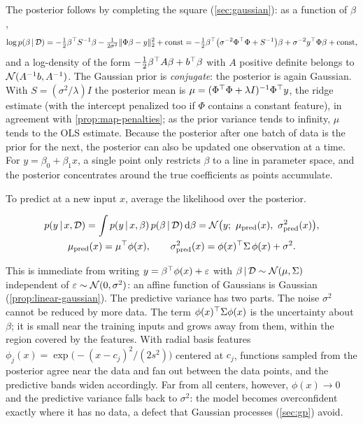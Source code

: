 The posterior follows by completing the square (\cref{sec:gaussian}): as a function of $\beta$,
\[
\log p(\beta\,|\,\mathcal{D})=-\tfrac12\beta^{\top} S^{-1}\beta-\tfrac{1}{2\sigma^2}\lVert \Phi\beta-y\rVert_2^2+\text{const}
=-\tfrac12\beta^{\top}\big(\sigma^{-2}\Phi^{\top}\Phi+S^{-1}\big)\beta+\sigma^{-2}y^{\top}\Phi\beta+\text{const},
\]
and a log-density of the form $-\frac12\beta^{\top} A\beta+b^{\top}\beta$ with $A$ positive definite belongs to $\mathcal{N}(A^{-1}b,A^{-1})$. The Gaussian prior is \emph{conjugate}: the posterior is again Gaussian. With $S=(\sigma^2/\lambda)I$ the posterior mean is $\mu=(\Phi^{\top}\Phi+\lambda I)^{-1}\Phi^{\top} y$, the ridge estimate (with the intercept penalized too if $\Phi$ contains a constant feature), in agreement with \cref{prop:map-penalties}; as the prior variance tends to infinity, $\mu$ tends to the OLS estimate. Because the posterior after one batch of data is the prior for the next, the posterior can also be updated one observation at a time. For $y=\beta_0+\beta_1x$, a single point only restricts $\beta$ to a line in parameter space, and the posterior concentrates around the true coefficients as points accumulate.

To predict at a new input $x$, average the likelihood over the posterior.

\begin{proposition}\label{prop:blr-predictive}
\begin{gather*}
p(y\given x,\cD)=\int p(y\given x,\beta)\,p(\beta\given\cD)\dd\beta=\cN\big(y;\ \mu_{\mathrm{pred}}(x),\ \sigma^2_{\mathrm{pred}}(x)\big),\\
\mu_{\mathrm{pred}}(x)=\mu\T\phi(x),\qquad \sigma^2_{\mathrm{pred}}(x)=\phi(x)\T\Sigma\,\phi(x)+\sigma^2 .
\end{gather*}
\end{proposition}

This is immediate from writing $y=\beta^{\top}\phi(x)+\varepsilon$ with $\beta\,|\,\mathcal{D}\sim\mathcal{N}(\mu,\Sigma)$ independent of $\varepsilon\sim\mathcal{N}(0,\sigma^2)$: an affine function of Gaussians is Gaussian (\cref{prop:linear-gaussian}). The predictive variance has two parts. The noise $\sigma^2$ cannot be reduced by more data. The term $\phi(x)^{\top}\Sigma\phi(x)$ is the uncertainty about $\beta$; it is small near the training inputs and grows away from them, within the region covered by the features. With radial basis features $\phi_j(x)=\exp\big(-(x-c_j)^2/(2s^2)\big)$ centered at $c_j$, functions sampled from the posterior agree near the data and fan out between the data points, and the predictive bands widen accordingly. Far from all centers, however, $\phi(x)\to0$ and the predictive variance falls back to $\sigma^2$: the model becomes overconfident exactly where it has no data, a defect that Gaussian processes (\cref{sec:gp}) avoid.

